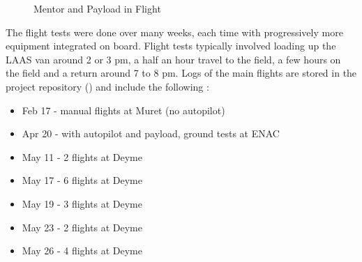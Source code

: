 \documentclass[a4paper,11pt]{report}
\begin{document}
\begin{figure}[ht]
  \centering
  \caption{Mentor and Payload in Flight}
 \label{fig:mentor_flying}
\end{figure}


The flight tests were done over many weeks, each time with progressively more equipment integrated on board. Flight tests typically involved loading up the LAAS van around 2 or 3 pm, a half an hour travel to the field, a few hours on the field and a return around 7 to 8 pm. Logs of the main flights are stored in the project repository (\cite{laserhawkgit}) and include the following :

\begin{itemize}
 \item Feb 17 - manual flights at Muret (no autopilot)
 \item Apr 20 - with autopilot and payload, ground tests at ENAC
 \item May 11 - 2 flights at Deyme
 \item May 17 - 6 flights at Deyme
 \item May 19 - 3 flights at Deyme
 \item May 23 - 2 flights at Deyme
 \item May 26 - 4 flights at Deyme
\end{itemize}
\end{document}
